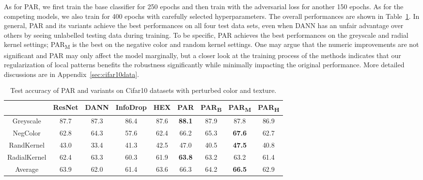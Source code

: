 \documentclass{article}
\begin{document}
As for PAR, 
we first train the base classifier 
for 250 epochs 
and then train with the adversarial loss for another 150 epochs. As for the competing models, we also train for 400 epochs with carefully selected hyperparameters.
The overall performances 
are shown in Table~\ref{tab:cifar10}. 
In general, PAR and its variants achieve the best performances 
on all four test data sets, 
even when DANN has an unfair advantage over others by seeing unlabelled testing data during training. 
To be specific, PAR achieves 
the best performances on the greyscale and radial kernel settings;
PAR\textsubscript{M} is the best on the negative color and random kernel settings.
One may argue that the numeric improvements are not significant and PAR may only affect the model marginally, 
but a closer look at the training process of the methods indicates that our regularization of local patterns benefits the robustness significantly while minimally impacting the original performance. 
More detailed discussions are in Appendix~\ref{sec:cifar10data}.


\begin{table}[t]
\caption{Test accuracy of PAR and variants on Cifar10 datasets with perturbed color and texture.\break \tiny}
\label{tab:cifar10}
\centering
\begin{tabular}{ccccccccc}
\hline
 & ResNet & DANN & InfoDrop & HEX & PAR & PAR\textsubscript{B} & PAR\textsubscript{M} & PAR\textsubscript{H} \\ \hline
Greyscale & 87.7 & 87.3 & 86.4 & 87.6 & \textbf{88.1} & 87.9 & 87.8 & 86.9 \\
NegColor & 62.8 & 64.3 & 57.6 & 62.4 & 66.2 & 65.3 & \textbf{67.6} & 62.7 \\
RandKernel & 43.0 & 33.4 & 41.3 & 42.5 & 47.0 & 40.5 & \textbf{47.5} & 40.8 \\
RadialKernel & 62.4 & 63.3 & 60.3 & 61.9 & \textbf{63.8} & 63.2 & 63.2 & 61.4 \\ \hline
Average & 63.9 & 62.0 & 61.4 & 63.6 & 66.3 & 64.2 & \textbf{66.5} & 62.9 \\ \hline
\end{tabular}
\end{table}
\end{document}
